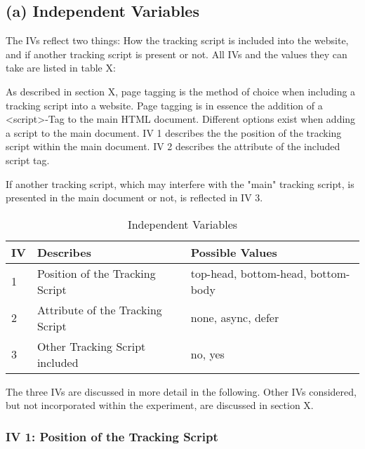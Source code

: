 


\subsection{(a) Independent Variables}


The IVs reflect two things:
How the tracking script is included into the website, and if another tracking script is present or not.
All IVs and the values they can take are listed in table X:

As described in section X, page tagging is the method of choice when including a tracking script into a website.
Page tagging is in essence the addition of a <script>-Tag to the main HTML document.
Different options exist when adding a script to the main document.
IV 1 describes the the position of the tracking script within the main document.
IV 2 describes the attribute of the included script tag.

If another tracking script, which may interfere with the "main" tracking script, is presented in the main document or not, is reflected in IV 3.

\begin{table}[h]
	\small
	\centering
	\begin{tabular}{ | l | l | l | }
	\hline
	IV \cellcolor{lightgrey} & Describes \cellcolor{lightgrey} & Possible Values \cellcolor{lightgrey} \\
	\hline
	1 & Position of the Tracking Script & top-head, bottom-head, bottom-body \\
	2 & Attribute of the Tracking Script & none, async, defer \\
	3 & Other Tracking Script included & no, yes \\
	\hline
	\end{tabular}
	\medskip
	\caption{Independent Variables}
	\label{table:independent_variables}
\end{table}


The three IVs are discussed in more detail in the following.
Other IVs considered, but not incorporated within the experiment, are discussed in section X.


\subsubsection{IV 1: Position of the Tracking Script}

